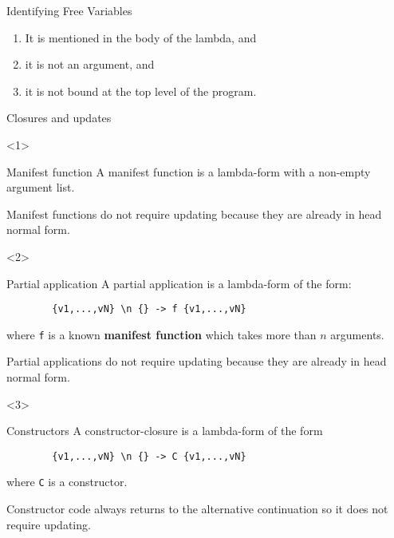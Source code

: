 \documentclass{beamer}
\begin{document}
\begin{frame}{Identifying Free Variables}
  \begin{enumerate}
  \item<1-> It is mentioned in the body of the lambda, and
  \item<2-> it is not an argument, and
  \item<3-> it is not bound at the top level of the program.
  \end{enumerate}
\end{frame}

\begin{frame}[fragile]{Closures and updates}
  \begin{onlyenv}<1>
    \begin{block}{Manifest function}
      A manifest function is a lambda-form with a non-empty argument list.

      Manifest functions do not require updating because they are already in
      head normal form.
    \end{block}
  \end{onlyenv}

  \begin{onlyenv}<2>
    \begin{block}{Partial application}
      A partial application is a lambda-form of the form:

      \begin{verbatim}
        {v1,...,vN} \n {} -> f {v1,...,vN}
      \end{verbatim}

      where \texttt{f} is a known \textbf{manifest function} which takes more
      than $n$ arguments.

      Partial applications do not require updating because they are already in
      head normal form.
    \end{block}
  \end{onlyenv}

  \begin{onlyenv}<3>
    \begin{block}{Constructors}
      A constructor-closure is a lambda-form of the form

      \begin{verbatim}
        {v1,...,vN} \n {} -> C {v1,...,vN}
      \end{verbatim}

      where \texttt{C} is a constructor.

      Constructor code always returns to the alternative continuation so it does
      not require updating.
    \end{block}
  \end{onlyenv}


\end{frame}
\end{document}
